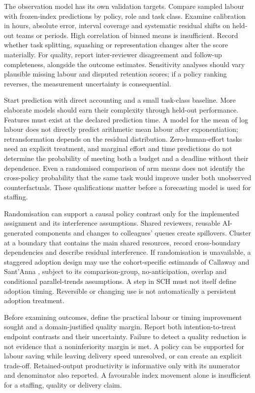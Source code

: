 \documentclass[11pt,a4paper]{amsart}
\theoremstyle{definition}
\theoremstyle{remark}
\begin{document}
The observation model has its own validation targets. Compare sampled labour with frozen-index predictions by policy, role and task class. Examine calibration in hours, absolute error, interval coverage and systematic residual shifts on held-out teams or periods. High correlation of binned means is insufficient. Record whether task splitting, squashing or representation changes alter the score materially. For quality, report inter-reviewer disagreement and follow-up completeness, alongside the outcome estimates. Sensitivity analyses should vary plausible missing labour and disputed retention scores; if a policy ranking reverses, the measurement uncertainty is consequential.

Start prediction with direct accounting and a small task-class baseline. More elaborate models should earn their complexity through held-out performance. Features must exist at the declared prediction time. A model for the mean of log labour does not directly predict arithmetic mean labour after exponentiation; retransformation depends on the residual distribution. Zero-human-effort tasks need an explicit treatment, and marginal effort and time predictions do not determine the probability of meeting both a budget and a deadline without their dependence. Even a randomised comparison of arm means does not identify the cross-policy probability that the same task would improve under both unobserved counterfactuals. These qualifications matter before a forecasting model is used for staffing.

Randomisation can support a causal policy contrast only for the implemented assignment and its interference assumptions. Shared reviewers, reusable AI-generated components and changes to colleagues' queues create spillovers. Cluster at a boundary that contains the main shared resources, record cross-boundary dependencies and describe residual interference. If randomisation is unavailable, a staggered adoption design may use the cohort-specific estimands of Callaway and Sant'Anna \cite{callaway2021}, subject to its comparison-group, no-anticipation, overlap and conditional parallel-trends assumptions. A step in SCH must not itself define adoption timing. Reversible or changing use is not automatically a persistent adoption treatment.

Before examining outcomes, define the practical labour or timing improvement sought and a domain-justified quality margin. Report both intention-to-treat endpoint contrasts and their uncertainty. Failure to detect a quality reduction is not evidence that a noninferiority margin is met. A policy can be supported for labour saving while leaving delivery speed unresolved, or can create an explicit trade-off. Retained-output productivity is informative only with its numerator and denominator also reported. A favourable index movement alone is insufficient for a staffing, quality or delivery claim.
\end{document}
